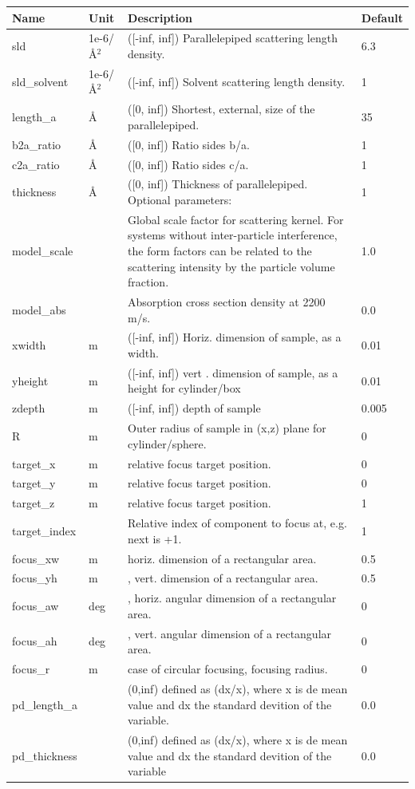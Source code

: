 \begin{longtable}{p{}p{}p{}p{}}
\toprule
\textbf{Name} & \textbf{Unit} & \textbf{Description} & \textbf{Default} \\
\midrule
\endhead
sld & 1e-6/\AA{}$^{2}$ & ([-inf, inf]) Parallelepiped scattering length density. & 6.3 \\
sld\_solvent & 1e-6/\AA{}$^{2}$ & ([-inf, inf]) Solvent scattering length density. & 1 \\
length\_a & \AA{} & ([0, inf]) Shortest, external, size of the parallelepiped. & 35 \\
b2a\_ratio & \AA{} & ([0, inf]) Ratio sides b/a. & 1 \\
c2a\_ratio & \AA{} & ([0, inf]) Ratio sides c/a. & 1 \\
thickness & \AA{} & ([0, inf]) Thickness of parallelepiped. Optional parameters: & 1 \\
model\_scale &   & Global scale factor for scattering kernel. For systems without inter-particle interference, the form factors can be related to the scattering intensity by the particle volume fraction. & 1.0 \\
model\_abs &   & Absorption cross section density at 2200 m/s. & 0.0 \\
xwidth & m & ([-inf, inf]) Horiz. dimension of sample, as a width. & 0.01 \\
yheight & m & ([-inf, inf]) vert . dimension of sample, as a height for cylinder/box & 0.01 \\
zdepth & m & ([-inf, inf]) depth of sample & 0.005 \\
R & m & Outer radius of sample in (x,z) plane for cylinder/sphere. & 0 \\
target\_x & m & relative focus target position. & 0 \\
target\_y & m & relative focus target position. & 0 \\
target\_z & m & relative focus target position. & 1 \\
target\_index &   & Relative index of component to focus at, e.g. next is +1. & 1 \\
focus\_xw & m & horiz. dimension of a rectangular area. & 0.5 \\
focus\_yh & m & , vert. dimension of a rectangular area. & 0.5 \\
focus\_aw & deg & , horiz. angular dimension of a rectangular area. & 0 \\
focus\_ah & deg & , vert. angular dimension of a rectangular area. & 0 \\
focus\_r & m & case of circular focusing, focusing radius. & 0 \\
pd\_length\_a &  & (0,inf) defined as (dx/x), where x is de mean value and dx the standard devition of the variable. & 0.0 \\
pd\_thickness &  & (0,inf) defined as (dx/x), where x is de mean value and dx the standard devition of the variable & 0.0 \\
\bottomrule
\end{longtable}

